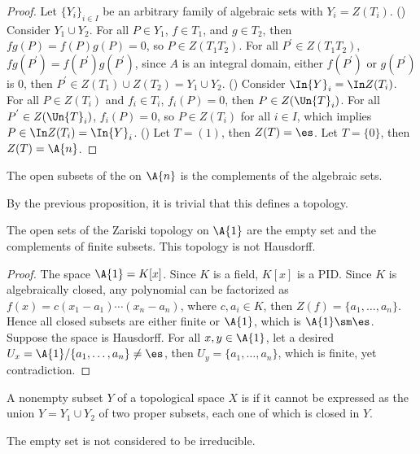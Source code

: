 \documentclass[10pt]{article}
\begin{document}
\begin{proof}
    Let ${\{{Y}_{i}\}}_{i\in I}$ be an arbitrary family of algebraic sets with ${Y}_{i}=Z({T}_{i})$. 
    () Consider ${Y}_{1}\cup{Y}_{2}$. For all $P\in{Y}_{1}$, $f\in{T}_{1}$, and $g\in{T}_{2}$, then $fg(P)=f(P)g(P)=0$, so $P\in Z({T}_{1}{T}_{2})$. For all ${P}^{'}\in Z({T}_{1}{T}_{2})$, $fg({P}^{'})=f({P}^{'})g({P}^{'})$, since $A$ is an integral domain, either $f({P}^{'})$ or $g({P}^{'})$ is 0, then ${P}^{'}\in Z({T}_{1})\cup Z({T}_{2})={Y}_{1}\cup{Y}_{2}$. () Consider $\In{Y}_{i}=\In Z({T}_{i})$. For all $P\in Z({T}_{i})$ and ${f}_{i}\in{T}_{i}$, ${f}_{i}(P)=0$, then $P\in Z(\Un{T}_{i})$. For all ${P}^{'}\in Z(\Un{T}_{i})$, ${f}_{i}(P)=0$, so $P\in Z({T}_{i})$ for all $i\in I$, which implies $P\in\In Z({T}_{i})=\In{Y}_{i}$. () Let $T=(1)$, then $Z(T)=\es$. Let $T=\{0\}$, then $Z(T)=\A{n}$.
\end{proof}
\begin{definition}
    The open subsets of the  on $\A{n}$ is the complements of the algebraic sets.
\end{definition}
\par
By the previous proposition, it is trivial that this defines a topology.
\begin{example}
    The open sets of the Zariski topology on $\A{1}$ are the empty set and the complements of finite subsets. This topology is not Hausdorff.
\end{example}
\begin{proof}
    The space $\A{1}=K[x]$. Since $K$ is a field, $K[x]$ is a PID. Since $K$ is algebraically closed, any polynomial can be factorized as $f(x)=c({x}_{1}-{a}_{1})\cdots({x}_{n}-{a}_{n})$, where $c,{a}_{i}\in K$, then $Z(f)=\{{a}_{1},\dots,{a}_{n}\}$. Hence all closed subsets are either finite or $\A{1}$, which is $\A{1}\sm\es$. Suppose the space is Hausdorff. For all $x,y\in\A{1}$, let a desired ${U}_{x}=\A{1}/\{{a}_{1},\dots,{a}_{n}\}\ne\es$, then ${U}_{y}=\{{a}_{1},\dots,{a}_{n}\}$, which is finite, yet contradiction.
\end{proof}
\begin{definition}
    A nonempty subset $Y$ of a topological space $X$ is  if it cannot be expressed as the union $Y={Y}_{1}\cup{Y}_{2}$ of two proper subsets, each one of which is closed in $Y$.
\end{definition}
\begin{remark}
    The empty set is not considered to be irreducible.
\end{remark}
\end{document}
